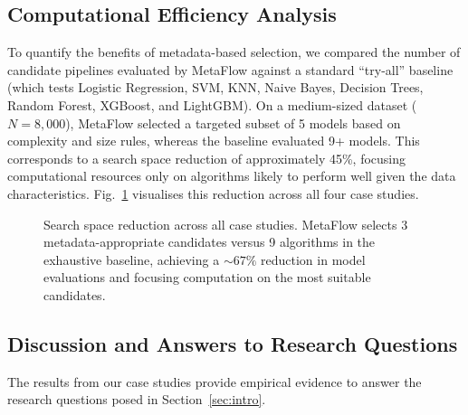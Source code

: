 \documentclass[conference]{IEEEtran}
\begin{document}
   \subsection{Computational Efficiency Analysis}
   To quantify the benefits of metadata-based selection, we compared the number of candidate pipelines evaluated by MetaFlow against a standard ``try-all'' baseline (which tests Logistic Regression, SVM, KNN, Naive Bayes, Decision Trees, Random Forest, XGBoost, and LightGBM).
   On a medium-sized dataset ($N=8{,}000$), MetaFlow selected a targeted subset of 5 models based on complexity and size rules, whereas the baseline evaluated 9+ models. This corresponds to a search space reduction of approximately 45\%, focusing computational resources only on algorithms likely to perform well given the data characteristics.
   Fig.~\ref{fig:search_reduction} visualises this reduction across all four case studies.

   \begin{figure}[ht]
   \centering
   \caption{Search space reduction across all case studies. MetaFlow selects 3 metadata-appropriate candidates versus 9 algorithms in the exhaustive baseline, achieving a $\sim\!67\%$ reduction in model evaluations and focusing computation on the most suitable candidates.}
   \label{fig:search_reduction}
   \end{figure}

   \subsection{Discussion and Answers to Research Questions}
   The results from our case studies provide empirical evidence to answer the research questions posed in Section~\ref{sec:intro}.
\end{document}
